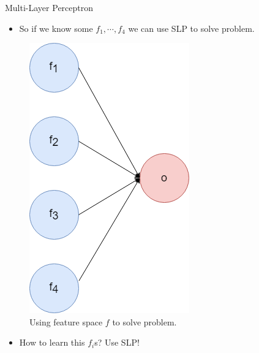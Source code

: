 \begin{frame}{Multi-Layer Perceptron}
    \begin{itemize}
        \item So if we know some $f_1, \cdots, f_4$ we can use SLP to solve problem.
    \end{itemize}
    \begin{figure}[H]
        \centering
        \includegraphics[height=0.45\textheight]{Figs/feature_space.png}
        \caption{Using feature space $f$ to solve problem.}
    \end{figure}
    \begin{itemize}
        \item How to learn this $f_i$s? Use SLP!
    \end{itemize}
\end{frame}

